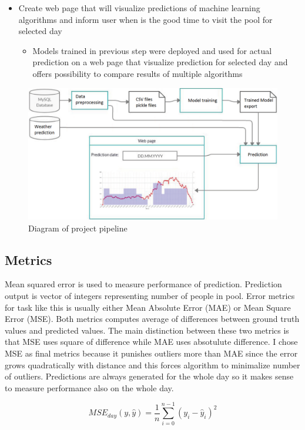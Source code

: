\documentclass{article}
\begin{document}
\begin{itemize}
\item Create web page that will visualize predictions of machine learning algorithms and inform user when is the good time to visit the pool for selected day
\begin{itemize}
\item Models trained in previous step were deployed and used for actual prediction on a web page that visualize prediction for selected day and offers possibility to compare results of multiple algorithms
\end{itemize}
\end{itemize}

\begin{figure}[h!]
\centering
\includegraphics[width=12cm]{imgs/project_pipeline}
\caption{Diagram of project pipeline}
\label{fig:diagram_pipeline}
\end{figure}

\subsection{Metrics}
Mean squared error is used to measure performance of prediction. Prediction output is vector of integers representing number of people in pool. Error metrics for task like this is usually either Mean Absolute Error (MAE) or Mean Square Error (MSE). Both metrics computes average of differences between ground truth values and predicted values. The main distinction between these two metrics is that MSE uses square of difference while MAE uses absotulute difference. I chose MSE as final metrics because it punishes outliers more than MAE since the error grows quadratically with distance and this forces algorithm to minimalize number of outliers. Predictions are always generated for the whole day so it makes sense to measure performance also on the whole day. 

\begin{equation}
\label{eq:mse}
MSE_{day}(y,\hat{y}) = \dfrac{1}{n} \sum^{n-1}_{i=0}(y_i-\hat{y}_i)^2
\end{equation}
\end{document}
